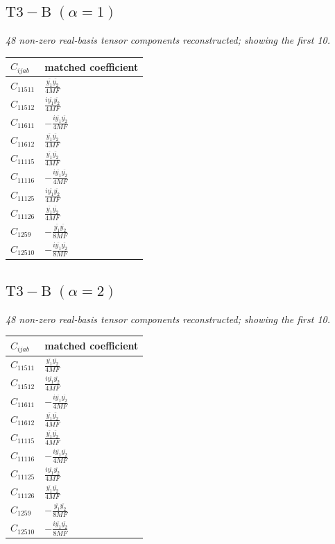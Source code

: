 \documentclass[9pt]{article}
\begin{document}
\subsection*{$ \mathrm{T3-B}\;(\alpha=1) $}
\textit{48 non-zero real-basis tensor components reconstructed; showing the first 10.}
\begin{longtable}{@{}ll@{}}
\toprule
$C_{ijab}$ & matched coefficient \\
\midrule
$C_{11511}$ & $ \frac{\overline{y_{1}} \overline{y_{2}}}{4 MF} $ \\
$C_{11512}$ & $ \frac{i \overline{y_{1}} \overline{y_{2}}}{4 MF} $ \\
$C_{11611}$ & $ - \frac{i \overline{y_{1}} \overline{y_{2}}}{4 MF} $ \\
$C_{11612}$ & $ \frac{\overline{y_{1}} \overline{y_{2}}}{4 MF} $ \\
$C_{11115}$ & $ \frac{\overline{y_{1}} \overline{y_{2}}}{4 MF} $ \\
$C_{11116}$ & $ - \frac{i \overline{y_{1}} \overline{y_{2}}}{4 MF} $ \\
$C_{11125}$ & $ \frac{i \overline{y_{1}} \overline{y_{2}}}{4 MF} $ \\
$C_{11126}$ & $ \frac{\overline{y_{1}} \overline{y_{2}}}{4 MF} $ \\
$C_{1259}$ & $ - \frac{\overline{y_{1}} \overline{y_{2}}}{8 MF} $ \\
$C_{12510}$ & $ - \frac{i \overline{y_{1}} \overline{y_{2}}}{8 MF} $ \\
\bottomrule
\end{longtable}
\subsection*{$ \mathrm{T3-B}\;(\alpha=2) $}
\textit{48 non-zero real-basis tensor components reconstructed; showing the first 10.}
\begin{longtable}{@{}ll@{}}
\toprule
$C_{ijab}$ & matched coefficient \\
\midrule
$C_{11511}$ & $ \frac{\overline{y_{1}} \overline{y_{2}}}{4 MF} $ \\
$C_{11512}$ & $ \frac{i \overline{y_{1}} \overline{y_{2}}}{4 MF} $ \\
$C_{11611}$ & $ - \frac{i \overline{y_{1}} \overline{y_{2}}}{4 MF} $ \\
$C_{11612}$ & $ \frac{\overline{y_{1}} \overline{y_{2}}}{4 MF} $ \\
$C_{11115}$ & $ \frac{\overline{y_{1}} \overline{y_{2}}}{4 MF} $ \\
$C_{11116}$ & $ - \frac{i \overline{y_{1}} \overline{y_{2}}}{4 MF} $ \\
$C_{11125}$ & $ \frac{i \overline{y_{1}} \overline{y_{2}}}{4 MF} $ \\
$C_{11126}$ & $ \frac{\overline{y_{1}} \overline{y_{2}}}{4 MF} $ \\
$C_{1259}$ & $ - \frac{\overline{y_{1}} \overline{y_{2}}}{8 MF} $ \\
$C_{12510}$ & $ - \frac{i \overline{y_{1}} \overline{y_{2}}}{8 MF} $ \\
\bottomrule
\end{longtable}
\end{document}
